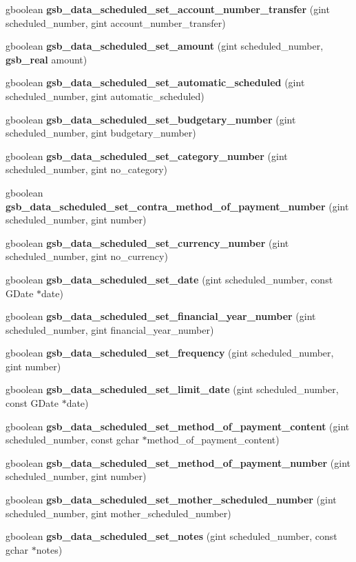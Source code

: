 \begin{DoxyCompactItemize}
\item 
gboolean {\bf gsb\_\-data\_\-scheduled\_\-set\_\-account\_\-number\_\-transfer} (gint scheduled\_\-number, gint account\_\-number\_\-transfer)
\item 
gboolean {\bf gsb\_\-data\_\-scheduled\_\-set\_\-amount} (gint scheduled\_\-number, {\bf gsb\_\-real} amount)
\item 
gboolean {\bf gsb\_\-data\_\-scheduled\_\-set\_\-automatic\_\-scheduled} (gint scheduled\_\-number, gint automatic\_\-scheduled)
\item 
gboolean {\bf gsb\_\-data\_\-scheduled\_\-set\_\-budgetary\_\-number} (gint scheduled\_\-number, gint budgetary\_\-number)
\item 
gboolean {\bf gsb\_\-data\_\-scheduled\_\-set\_\-category\_\-number} (gint scheduled\_\-number, gint no\_\-category)
\item 
gboolean {\bf gsb\_\-data\_\-scheduled\_\-set\_\-contra\_\-method\_\-of\_\-payment\_\-number} (gint scheduled\_\-number, gint number)
\item 
gboolean {\bf gsb\_\-data\_\-scheduled\_\-set\_\-currency\_\-number} (gint scheduled\_\-number, gint no\_\-currency)
\item 
gboolean {\bf gsb\_\-data\_\-scheduled\_\-set\_\-date} (gint scheduled\_\-number, const GDate $\ast$date)
\item 
gboolean {\bf gsb\_\-data\_\-scheduled\_\-set\_\-financial\_\-year\_\-number} (gint scheduled\_\-number, gint financial\_\-year\_\-number)
\item 
gboolean {\bf gsb\_\-data\_\-scheduled\_\-set\_\-frequency} (gint scheduled\_\-number, gint number)
\item 
gboolean {\bf gsb\_\-data\_\-scheduled\_\-set\_\-limit\_\-date} (gint scheduled\_\-number, const GDate $\ast$date)
\item 
gboolean {\bf gsb\_\-data\_\-scheduled\_\-set\_\-method\_\-of\_\-payment\_\-content} (gint scheduled\_\-number, const gchar $\ast$method\_\-of\_\-payment\_\-content)
\item 
gboolean {\bf gsb\_\-data\_\-scheduled\_\-set\_\-method\_\-of\_\-payment\_\-number} (gint scheduled\_\-number, gint number)
\item 
gboolean {\bf gsb\_\-data\_\-scheduled\_\-set\_\-mother\_\-scheduled\_\-number} (gint scheduled\_\-number, gint mother\_\-scheduled\_\-number)
\item 
gboolean {\bf gsb\_\-data\_\-scheduled\_\-set\_\-notes} (gint scheduled\_\-number, const gchar $\ast$notes)
\item 

\end{DoxyCompactItemize}
